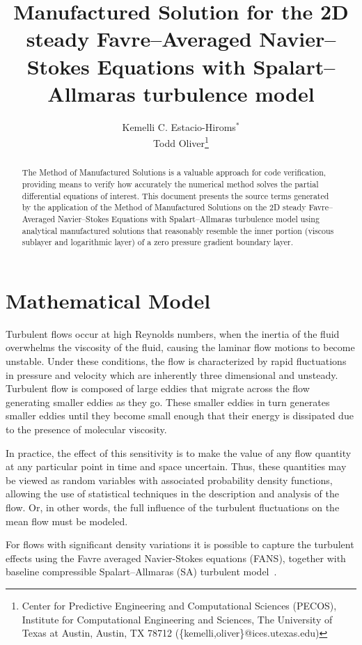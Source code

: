 \documentclass[10pt]{article}
\title{Manufactured Solution for the 2D steady Favre--Averaged Navier--Stokes Equations with Spalart--Allmaras turbulence model}
\author{Kemelli C. Estacio-Hiroms$^*$ \\ Todd Oliver\thanks{Center for Predictive Engineering and Computational Sciences (PECOS), Institute for Computational
    Engineering and Sciences, The University of Texas at Austin,
    Austin, TX 78712 (\{kemelli,oliver\}@ices.utexas.edu)}}
\begin{document}
\maketitle
\tableofcontents

\begin{abstract}
The Method of Manufactured Solutions is a valuable approach for code verification, providing means to verify how accurately the numerical method solves the partial differential equations of interest.
This document presents the source terms generated by the application of the Method of Manufactured Solutions on the 2D steady Favre--Averaged Navier--Stokes Equations with Spalart--Allmaras turbulence model using analytical manufactured solutions that  reasonably resemble the inner portion (viscous sublayer and logarithmic layer) of a zero pressure gradient boundary layer.
\end{abstract}





\section{Mathematical Model}

Turbulent flows occur at high Reynolds numbers, when the inertia of the fluid overwhelms the viscosity of the fluid, causing the laminar flow motions to become unstable. Under these conditions, the flow is characterized by rapid fluctuations in pressure and velocity which are inherently three dimensional and unsteady. Turbulent flow is composed of large eddies that migrate across the flow generating smaller eddies as they go. These smaller eddies in turn generates smaller eddies until they become small enough that their energy is dissipated due to the presence of molecular viscosity.

In practice, the effect of this sensitivity
is to make the value of any flow quantity at any particular point in
time and space uncertain.  Thus, these quantities may be viewed as
random variables with associated probability density functions,
allowing the use of statistical techniques in the description and
analysis of the flow. Or, in other words, the full influence of the turbulent fluctuations on the mean flow must be modeled.

For flows with significant density variations it is possible to  capture the turbulent effects using the Favre averaged Navier-Stokes equations (FANS), together with baseline compressible Spalart--Allmaras (SA) turbulent model~\citep{Oliver2010}.
\end{document}
